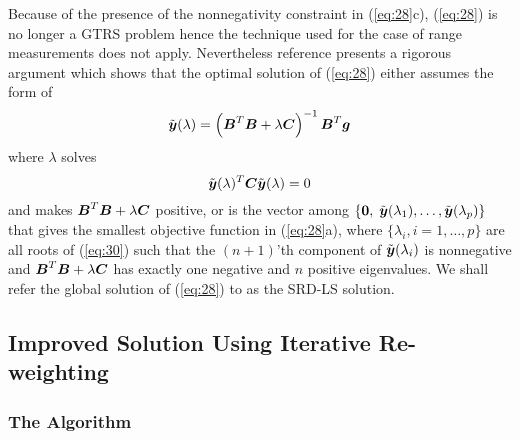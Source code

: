 Because of the presence of the nonnegativity constraint in (\ref{eq:28}c), (\ref{eq:28}) is no longer a GTRS problem hence the technique used for the case of range measurements does not apply. Nevertheless reference \cite{BeckStLi} presents a rigorous argument which shows that the optimal solution of (\ref{eq:28}) either assumes the form of
 \begin{equation}
 \nonumber
 \tilde{\mbox{\boldmath$y$}}(\lambda)=\left(\mbox{\boldmath$B$}^T\mbox{\boldmath$B$}+\lambda\mbox{\boldmath$C$}\right)^{-1}\mbox{\boldmath$B$}^T\mbox{\boldmath$g$}
 \end{equation}
 where $\lambda$ solves
 \begin{equation}\label{eq:30}
 \tilde{\mbox{\boldmath$y$}}(\lambda)^T\mbox{\boldmath$C$}\tilde{\mbox{\boldmath$y$}}(\lambda)=0
 \end{equation}
 and makes $\mbox{\boldmath$B$}^T\mbox{\boldmath$B$}+\lambda\mbox{\boldmath$C$}$ positive, or is the vector among $\{\mbox{\boldmath{$0$}},$ $\tilde{\mbox{\boldmath$y$}}(\lambda_1),\ldots,\tilde{\mbox{\boldmath$y$}}(\lambda_p)\}$ that gives the smallest objective function in (\ref{eq:28}a), where $\{\lambda_i, i = 1,\ldots,p\}$ are all roots of (\ref{eq:30}) such that the $(n+1)$'th component of $\tilde{\mbox{\boldmath$y$}}(\lambda_i)$ is nonnegative and $\mbox{\boldmath$B$}^T\mbox{\boldmath$B$}+\lambda\mbox{\boldmath$C$}$ has exactly one negative and $n$ positive eigenvalues. We shall refer the global solution of (\ref{eq:28}) to as the SRD-LS solution.

\subsection{Improved Solution Using Iterative Re-weighting} %
\subsubsection{The Algorithm} %

